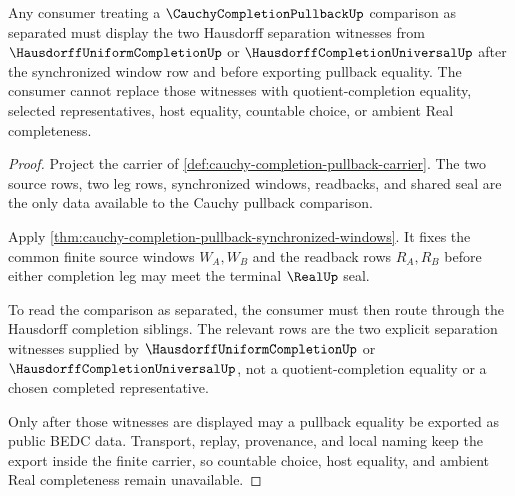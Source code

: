 \begin{theorem}
\label{thm:cauchy-completion-pullback-hausdorff-separation-route}
Any consumer treating a $\CauchyCompletionPullbackUp$ comparison as separated must display the two Hausdorff separation witnesses from $\HausdorffUniformCompletionUp$ or $\HausdorffCompletionUniversalUp$ after the synchronized window row and before exporting pullback equality. The consumer cannot replace those witnesses with quotient-completion equality, selected representatives, host equality, countable choice, or ambient Real completeness.
\end{theorem}
\begin{proof}
Project the carrier of \autoref{def:cauchy-completion-pullback-carrier}. The two source rows, two leg rows, synchronized windows, readbacks, and shared seal are the only data available to the Cauchy pullback comparison.

Apply \autoref{thm:cauchy-completion-pullback-synchronized-windows}. It fixes the common finite source windows $W_A,W_B$ and the readback rows $R_A,R_B$ before either completion leg may meet the terminal $\RealUp$ seal.

To read the comparison as separated, the consumer must then route through the Hausdorff completion siblings. The relevant rows are the two explicit separation witnesses supplied by $\HausdorffUniformCompletionUp$ or $\HausdorffCompletionUniversalUp$, not a quotient-completion equality or a chosen completed representative.

Only after those witnesses are displayed may a pullback equality be exported as public BEDC data. Transport, replay, provenance, and local naming keep the export inside the finite carrier, so countable choice, host equality, and ambient Real completeness remain unavailable.
\end{proof}



